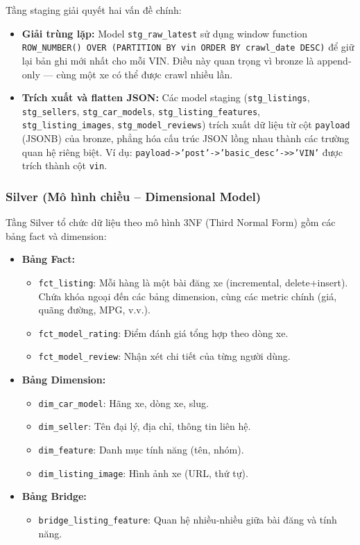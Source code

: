 Tầng staging giải quyết hai vấn đề chính:
\begin{itemize}
    \item \textbf{Giải trùng lặp:} Model \texttt{stg\_raw\_latest} sử dụng window function \texttt{ROW\_NUMBER() OVER (PARTITION BY vin ORDER BY crawl\_date DESC)} để giữ lại bản ghi mới nhất cho mỗi VIN. Điều này quan trọng vì bronze là append-only — cùng một xe có thể được crawl nhiều lần.
    \item \textbf{Trích xuất và flatten JSON:} Các model staging (\texttt{stg\_listings}, \texttt{stg\_sellers}, \texttt{stg\_car\_models}, \texttt{stg\_listing\_features}, \texttt{stg\_listing\_images}, \texttt{stg\_model\_reviews}) trích xuất dữ liệu từ cột \texttt{payload} (JSONB) của bronze, phẳng hóa cấu trúc JSON lồng nhau thành các trường quan hệ riêng biệt. Ví dụ: \texttt{payload->'post'->'basic\_desc'->>'VIN'} được trích thành cột \texttt{vin}.
\end{itemize}

\subsubsection{Silver (Mô hình chiều -- Dimensional Model)}

Tầng Silver tổ chức dữ liệu theo mô hình 3NF (Third Normal Form) gồm các bảng fact và dimension:

\begin{itemize}
    \item \textbf{Bảng Fact:}
    \begin{itemize}
        \item \texttt{fct\_listing}: Mỗi hàng là một bài đăng xe (incremental, delete+insert). Chứa khóa ngoại đến các bảng dimension, cùng các metric chính (giá, quãng đường, MPG, v.v.).
        \item \texttt{fct\_model\_rating}: Điểm đánh giá tổng hợp theo dòng xe.
        \item \texttt{fct\_model\_review}: Nhận xét chi tiết của từng người dùng.
    \end{itemize}
    \item \textbf{Bảng Dimension:}
    \begin{itemize}
        \item \texttt{dim\_car\_model}: Hãng xe, dòng xe, slug.
        \item \texttt{dim\_seller}: Tên đại lý, địa chỉ, thông tin liên hệ.
        \item \texttt{dim\_feature}: Danh mục tính năng (tên, nhóm).
        \item \texttt{dim\_listing\_image}: Hình ảnh xe (URL, thứ tự).
    \end{itemize}
    \item \textbf{Bảng Bridge:}
    \begin{itemize}
        \item \texttt{bridge\_listing\_feature}: Quan hệ nhiều-nhiều giữa bài đăng và tính năng.
    \end{itemize}
\end{itemize}


